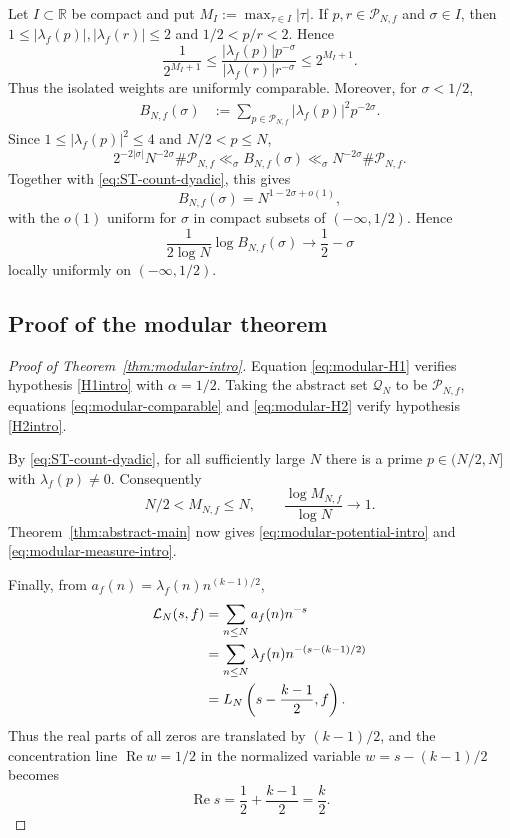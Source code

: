 \documentclass[11pt]{article}
\theoremstyle{definition}
\newcommand{\R}{\mathbb R}
\newcommand{\Ree}{\operatorname{Re}}
\newcommand{\1}{\mathbf 1}
\begin{document}
Let $I\subset\R$ be compact and put $M_I:=\max_{\tau\in I}|\tau|$.  If $p,r\in\mathcal P_{N,f}$ and $\sigma\in I$, then $1\le|\lambda_f(p)|,|\lambda_f(r)|\le2$ and $1/2<p/r<2$.  Hence
\begin{equation}\label{eq:modular-comparable}
\frac{1}{2^{M_I+1}}
\le
\frac{|\lambda_f(p)|p^{-\sigma}}{|\lambda_f(r)|r^{-\sigma}}
\le
2^{M_I+1}.
\end{equation}
Thus the isolated weights are uniformly comparable.  Moreover, for $\sigma<1/2$,
\begin{align}
B_{N,f}(\sigma)
&:=\sum_{p\in\mathcal P_{N,f}}|\lambda_f(p)|^2p^{-2\sigma}.
\label{eq:modular-isolated-energy-def}
\end{align}
Since $1\le|\lambda_f(p)|^2\le4$ and $N/2<p\le N$,
\[
2^{-2|\sigma|}N^{-2\sigma}\#\mathcal P_{N,f}
\ll_{\sigma} B_{N,f}(\sigma)
\ll_{\sigma}N^{-2\sigma}\#\mathcal P_{N,f}.
\]
Together with \eqref{eq:ST-count-dyadic}, this gives
\begin{equation}\label{eq:modular-isolated-energy}
B_{N,f}(\sigma)=N^{1-2\sigma+o(1)},
\end{equation}
with the $o(1)$ uniform for $\sigma$ in compact subsets of $(-\infty,1/2)$.  Hence
\begin{equation}\label{eq:modular-H2}
\frac1{2\log N}\log B_{N,f}(\sigma)
\longrightarrow\frac12-\sigma
\end{equation}
locally uniformly on $(-\infty,1/2)$.

\subsection{Proof of the modular theorem}

\begin{proof}[Proof of Theorem~\ref{thm:modular-intro}]
Equation \eqref{eq:modular-H1} verifies hypothesis \ref{H1intro} with $\alpha=1/2$.  Taking the abstract set $\mathcal Q_N$ to be $\mathcal P_{N,f}$, equations \eqref{eq:modular-comparable} and \eqref{eq:modular-H2} verify hypothesis \ref{H2intro}.

By \eqref{eq:ST-count-dyadic}, for all sufficiently large $N$ there is a prime $p\in(N/2,N]$ with $\lambda_f(p)\neq0$.  Consequently
\[
N/2<M_{N,f}\le N,
\qquad
\frac{\log M_{N,f}}{\log N}\longrightarrow1.
\]
Theorem~\ref{thm:abstract-main} now gives \eqref{eq:modular-potential-intro} and \eqref{eq:modular-measure-intro}.

Finally, from $a_f(n)=\lambda_f(n)n^{(k-1)/2}$,
\begin{align}
\mathcal L_N(s,f)
&=\sum_{n\le N}a_f(n)n^{-s}\notag\\
&=\sum_{n\le N}\lambda_f(n)n^{-(s-(k-1)/2)}\notag\\
&=L_N\left(s-\frac{k-1}{2},f\right).
\label{eq:classical-shift}
\end{align}
Thus the real parts of all zeros are translated by $(k-1)/2$, and the concentration line $\Ree w=1/2$ in the normalized variable $w=s-(k-1)/2$ becomes
\[
\Ree s=\frac12+\frac{k-1}{2}=\frac{k}{2}.
\]
\end{proof}
\end{document}
